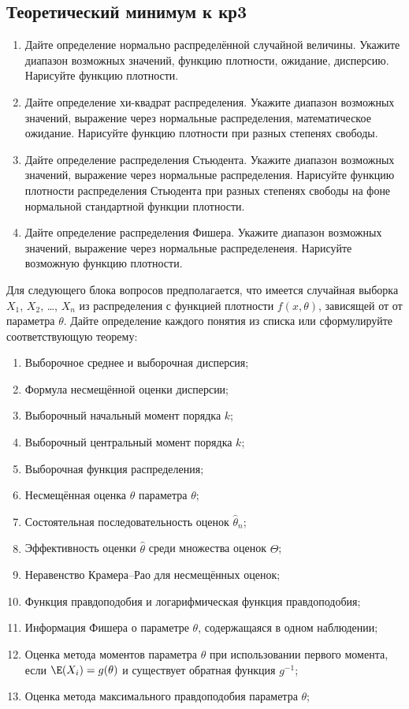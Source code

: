 \subsection{Теоретический минимум к кр3}

\begin{enumerate}
  \item Дайте определение нормально распределённой случайной величины. Укажите диапазон возможных значений, функцию плотности, ожидание, дисперсию. Нарисуйте функцию плотности.
  \item Дайте определение хи-квадрат распределения. Укажите диапазон возможных значений, выражение через нормальные распределения, математическое ожидание. Нарисуйте функцию плотности при разных степенях свободы.
  \item Дайте определение распределения Стьюдента. Укажите диапазон возможных значений, выражение через нормальные распределения. Нарисуйте функцию плотности распределения Стьюдента при разных степенях свободы на фоне нормальной стандартной функции плотности.
  \item Дайте определение распределения Фишера. Укажите диапазон возможных значений, выражение через нормальные распределенеия. Нарисуйте возможную функцию плотности.
\end{enumerate}

Для следующего блока вопросов предполагается, что
имеется случайная выборка $X_1$, $X_2$, \ldots, $X_n$ из распределения
с функцией плотности $f(x, \theta)$, зависящей от от параметра $\theta$. Дайте определение каждого понятия из списка или сформулируйте соответствующую теорему:

\begin{enumerate}[resume]
  \item Выборочное среднее и выборочная дисперсия;
  \item Формула несмещённой оценки дисперсии;
  \item Выборочный начальный момент порядка $k$;
  \item Выборочный центральный момент порядка $k$;
  \item Выборочная функция распределения;
  \item Несмещённая оценка $\hat \theta$ параметра $\theta$;
  \item Состоятельная последовательность оценок $\hat \theta_n$;
  \item Эффективность оценки $\hat \theta$ среди множества оценок $\hat \Theta$;
  \item Неравенство Крамера–Рао для несмещённых оценок;
  \item Функция правдоподобия и логарифмическая функция правдоподобия;
  \item Информация Фишера о параметре $\theta$, содержащаяся в одном наблюдении;
  \item Оценка метода моментов параметра $\theta$ при использовании первого момента, если $\E(X_i)=g(\theta)$ и существует обратная функция $g^{-1}$;
  \item Оценка метода максимального правдоподобия параметра $\theta$;
\end{enumerate}

